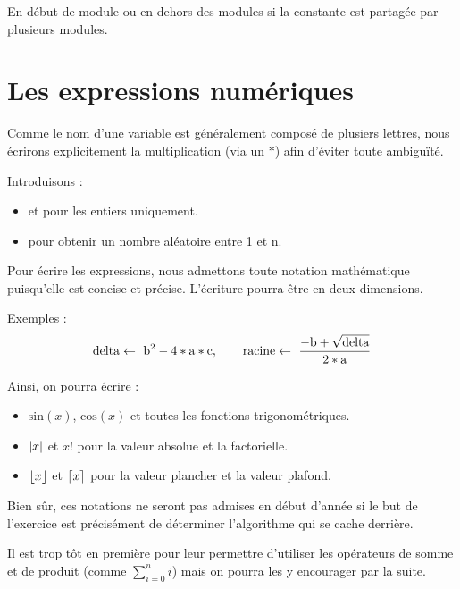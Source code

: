 	En début de module ou en dehors des modules si la constante
	est partagée par plusieurs modules.

\section{Les expressions numériques}

	Comme le nom d'une variable est généralement composé de plusiers lettres,
	nous écrirons explicitement la multiplication (via un $*$)
	afin d'éviter toute ambiguïté.

	Introduisons :

	\begin{itemize}
	\item
		 et  pour les entiers uniquement. 
	\item 
		 pour obtenir un nombre aléatoire entre 1 et n.
	\end{itemize}

	Pour écrire les expressions,
	nous admettons toute notation mathématique
	puisqu'elle est concise et précise.
	L'écriture pourra être en deux dimensions.
	
	Exemples : 
	\begin{equation*}
		\mathrm{delta} \gets\  \mathrm{b}^{2} - 4 * \mathrm{a} * \mathrm{c}
		,\qquad
		\mathrm{racine} \gets\  \frac{-\mathrm{b} + \sqrt{\mathrm{delta}}}{2*\mathrm{a}}
	\end{equation*}
	
	Ainsi, on pourra écrire :

	\DeclarePairedDelimiter\abs{\lvert}{\rvert}
	\DeclarePairedDelimiter\ceil{\lceil}{\rceil}
	\DeclarePairedDelimiter\floor{\lfloor}{\rfloor}
	
	\begin{itemize}
	\item 
		$\mathrm{sin}(x)$, $\mathrm{cos}(x)$ et toutes les fonctions trigonométriques.
	\item
		$\abs{x}$ et $x!$ pour la valeur absolue et la factorielle. 
	\item
		$\floor{x}$ et $\ceil{x}$ pour la valeur plancher et la valeur plafond. 
	\end{itemize}
	
	Bien sûr, ces notations ne seront pas admises
	en début d'année si le but de l'exercice
	est précisément de déterminer l'algorithme qui se cache derrière.
	
	\begin{Note}
	Il est trop tôt en première pour leur permettre
	d'utiliser les opérateurs de somme et de produit
	(comme $\sum_{i=0}^{n}i$)
	mais on pourra les y encourager par la suite.
	\end{Note}
	
